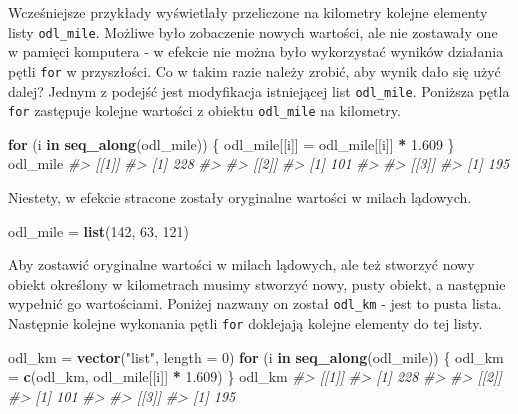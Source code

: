 \documentclass[paper=6in:9in,pagesize=pdftex,headinclude=on,footinclude=on,10pt]{scrbook}
\newenvironment{Shaded}{\begin{snugshade}}{\end{snugshade}}
\newcommand{\CommentTok}[1]{\textcolor[rgb]{0.56,0.35,0.01}{\textit{#1}}}
\newcommand{\ControlFlowTok}[1]{\textcolor[rgb]{0.13,0.29,0.53}{\textbf{#1}}}
\newcommand{\DataTypeTok}[1]{\textcolor[rgb]{0.13,0.29,0.53}{#1}}
\newcommand{\DecValTok}[1]{\textcolor[rgb]{0.00,0.00,0.81}{#1}}
\newcommand{\FloatTok}[1]{\textcolor[rgb]{0.00,0.00,0.81}{#1}}
\newcommand{\KeywordTok}[1]{\textcolor[rgb]{0.13,0.29,0.53}{\textbf{#1}}}
\newcommand{\NormalTok}[1]{#1}
\newcommand{\OperatorTok}[1]{\textcolor[rgb]{0.81,0.36,0.00}{\textbf{#1}}}
\newcommand{\StringTok}[1]{\textcolor[rgb]{0.31,0.60,0.02}{#1}}
\begin{document}
Wcześniejsze przykłady wyświetlały przeliczone na kilometry kolejne elementy listy \texttt{odl\_mile}.
Możliwe było zobaczenie nowych wartości, ale nie zostawały one w pamięci komputera - w efekcie nie można było wykorzystać wyników działania pętli \texttt{for} w przyszłości.
Co w takim razie należy zrobić, aby wynik dało się użyć dalej?
Jednym z podejść jest modyfikacja istniejącej list \texttt{odl\_mile}.
Poniższa pętla \texttt{for} zastępuje kolejne wartości z obiektu \texttt{odl\_mile} na kilometry.

\begin{Shaded}
\begin{Highlighting}[]
\ControlFlowTok{for}\NormalTok{ (i }\ControlFlowTok{in} \KeywordTok{seq_along}\NormalTok{(odl_mile)) \{}
\NormalTok{  odl_mile[[i]] =}\StringTok{ }\NormalTok{odl_mile[[i]] }\OperatorTok{*}\StringTok{ }\FloatTok{1.609}
\NormalTok{\}}
\NormalTok{odl_mile}
\CommentTok{#> [[1]]}
\CommentTok{#> [1] 228}
\CommentTok{#> }
\CommentTok{#> [[2]]}
\CommentTok{#> [1] 101}
\CommentTok{#> }
\CommentTok{#> [[3]]}
\CommentTok{#> [1] 195}
\end{Highlighting}
\end{Shaded}

Niestety, w efekcie stracone zostały oryginalne wartości w milach lądowych.

\begin{Shaded}
\begin{Highlighting}[]
\NormalTok{odl_mile =}\StringTok{ }\KeywordTok{list}\NormalTok{(}\DecValTok{142}\NormalTok{, }\DecValTok{63}\NormalTok{, }\DecValTok{121}\NormalTok{)}
\end{Highlighting}
\end{Shaded}

Aby zostawić oryginalne wartości w milach lądowych, ale też stworzyć nowy obiekt określony w kilometrach musimy stworzyć nowy, pusty obiekt, a następnie wypełnić go wartościami.
Poniżej nazwany on został \texttt{odl\_km} - jest to pusta lista.
Następnie kolejne wykonania pętli \texttt{for} doklejają kolejne elementy do tej listy.

\begin{Shaded}
\begin{Highlighting}[]
\NormalTok{odl_km =}\StringTok{ }\KeywordTok{vector}\NormalTok{(}\StringTok{"list"}\NormalTok{, }\DataTypeTok{length =} \DecValTok{0}\NormalTok{)}
\ControlFlowTok{for}\NormalTok{ (i }\ControlFlowTok{in} \KeywordTok{seq_along}\NormalTok{(odl_mile)) \{}
\NormalTok{  odl_km =}\StringTok{ }\KeywordTok{c}\NormalTok{(odl_km, odl_mile[[i]] }\OperatorTok{*}\StringTok{ }\FloatTok{1.609}\NormalTok{)}
\NormalTok{\}}
\NormalTok{odl_km}
\CommentTok{#> [[1]]}
\CommentTok{#> [1] 228}
\CommentTok{#> }
\CommentTok{#> [[2]]}
\CommentTok{#> [1] 101}
\CommentTok{#> }
\CommentTok{#> [[3]]}
\CommentTok{#> [1] 195}
\end{Highlighting}
\end{Shaded}
\end{document}
